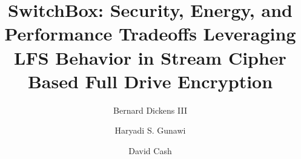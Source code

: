 \documentclass[sigplan,10pt,review,anonymous]{acmart}\settopmatter{printfolios=true,printccs=false,printacmref=false}
\begin{document}
\title{SwitchBox: Security, Energy, and Performance Tradeoffs Leveraging LFS
Behavior in Stream Cipher Based Full Drive Encryption}



\author{Bernard Dickens III}

\author{Haryadi S. Gunawi}

\author{David Cash}
\end{document}
